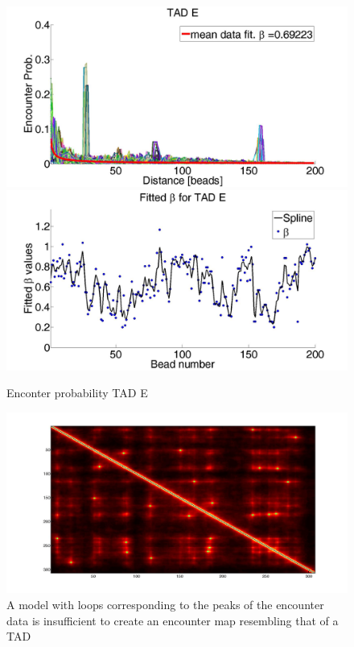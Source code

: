 \documentclass[12pt]{paper}
\begin{document}
\begin{figure}[H]
\includegraphics[scale=0.3]{meanDataFitTADE}
\includegraphics[scale=0.3]{fittedExpValuesWithSplineAverageTADE}
\caption{Enconter probability TAD E}
\label{figure_encounterProbabilityTADE+fittedBeta}
\end{figure}

\begin{figure}[H]
\includegraphics[scale=0.2]{meanEncounterMatrixOfSimulatingTADEandDWithLoops}
\caption{A model with loops corresponding to the peaks of the encounter data is insufficient to create an encounter map resembling that of a TAD}
\label{figure_encounterProbabilityPeaksOfTheEncounterData}
\end{figure}
\end{document}
